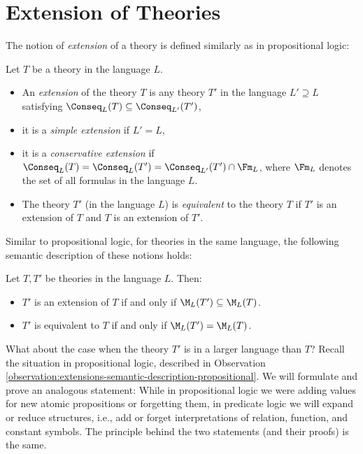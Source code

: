 \section{Extension of Theories}

The notion of \emph{extension} of a theory is defined similarly as in propositional logic:

\begin{definition}
    Let $T$ be a theory in the language $L$.
    \begin{itemize}
        \item An \emph{extension} of the theory $T$ is any theory $T'$ in the language $L'\supseteq L$ satisfying $\Conseq_L(T)\subseteq\Conseq_{L'}(T')$,
        \item it is a \emph{simple extension} if $L'=L$,
        \item it is a \emph{conservative extension} if $\Conseq_L(T)=\Conseq_L(T')=\Conseq_{L'}(T')\cap \Fm_L$, where $\Fm_L$ denotes the set of all formulas in the language $L$.
        \item The theory $T'$ (in the language $L$) is \emph{equivalent} to the theory $T$ if $T'$ is an extension of $T$ and $T$ is an extension of $T'$.
    \end{itemize}
\end{definition}

Similar to propositional logic, for theories in the same language, the following semantic description of these notions holds:

\begin{observation}
Let $T,T'$ be theories in the language $L$. Then:
\begin{itemize}
    \item $T'$ is an extension of $T$ if and only if $\M_L(T')\subseteq\M_L(T)$.
    \item $T'$ is equivalent to $T$ if and only if $\M_L(T')=\M_L(T)$.
\end{itemize}
\end{observation}

What about the case when the theory $T'$ is in a larger language than $T$? Recall the situation in propositional logic, described in Observation \ref{observation:extensions-semantic-description-propositional}. We will formulate and prove an analogous statement: While in propositional logic we were adding values for new atomic propositions or forgetting them, in predicate logic we will expand or reduce structures, i.e., add or forget interpretations of relation, function, and constant symbols. The principle behind the two statements (and their proofs) is the same.

